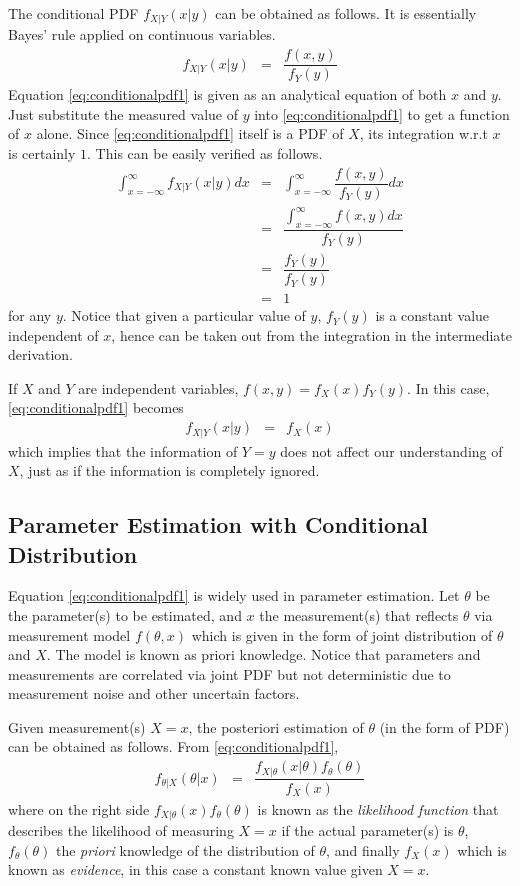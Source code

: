The conditional PDF $f_{X|Y}(x|y)$ can be obtained as follows. It is essentially Bayes' rule applied on continuous variables.
\begin{eqnarray}
  f_{X|Y}(x|y) &=& \dfrac{f(x, y)}{f_Y(y)} \label{eq:conditionalpdf1}
\end{eqnarray}
Equation \eqref{eq:conditionalpdf1} is given as an analytical equation of both $x$ and $y$. Just substitute the measured value of $y$ into \eqref{eq:conditionalpdf1} to get a function of $x$ alone. Since \eqref{eq:conditionalpdf1} itself is a PDF of $X$, its integration w.r.t $x$ is certainly $1$. This can be easily verified as follows.
\begin{eqnarray}
  \int_{x=-\infty}^{\infty}f_{X|Y}(x|y)dx &=& \int_{x=-\infty}^{\infty}\dfrac{f(x, y)}{f_Y(y)}dx \nonumber \\
  &=& \dfrac{\int_{x=-\infty}^{\infty}f(x, y)dx}{f_Y(y)} \nonumber \\
  &=& \dfrac{f_Y(y)}{f_Y(y)} \nonumber \\
  &=& 1 \nonumber
\end{eqnarray}
for any $y$. Notice that given a particular value of $y$, $f_Y(y)$ is a constant value independent of $x$, hence can be taken out from the integration in the intermediate derivation.

If $X$ and $Y$ are independent variables, $f(x,y) = f_X(x)f_Y(y)$. In this case, \eqref{eq:conditionalpdf1} becomes
\begin{eqnarray}
  f_{X|Y}(x|y) &=& f_X(x) \nonumber
\end{eqnarray}
which implies that the information of $Y=y$ does not affect our understanding of $X$, just as if the information is completely ignored.

\subsection{Parameter Estimation with Conditional Distribution}

Equation \eqref{eq:conditionalpdf1} is widely used in parameter estimation. Let $\theta$ be the parameter(s) to be estimated, and $x$ the measurement(s) that reflects $\theta$ via measurement model $f(\theta, x)$ which is given in the form of joint distribution of $\theta$ and $X$. The model is known as priori knowledge. Notice that parameters and measurements are correlated via joint PDF but not deterministic due to measurement noise and other uncertain factors.

Given measurement(s) $X=x$, the posteriori estimation of $\theta$ (in the form of PDF) can be obtained as follows. From \eqref{eq:conditionalpdf1},
\begin{eqnarray}
  f_{\theta|X}(\theta|x) &=& \dfrac{f_{X|\theta}(x|\theta)f_\theta(\theta)}{f_X(x)} \label{eq:conditionalpdf2}
\end{eqnarray}
where on the right side $f_{X|\theta}(x)f_\theta(\theta)$ is known as the \textit{likelihood function} that describes the likelihood of measuring $X=x$ if the actual parameter(s) is $\theta$, $f_\theta(\theta)$ the \textit{priori} knowledge of the distribution of $\theta$, and finally $f_X(x)$ which is known as \textit{evidence}, in this case a constant known value given $X=x$.

